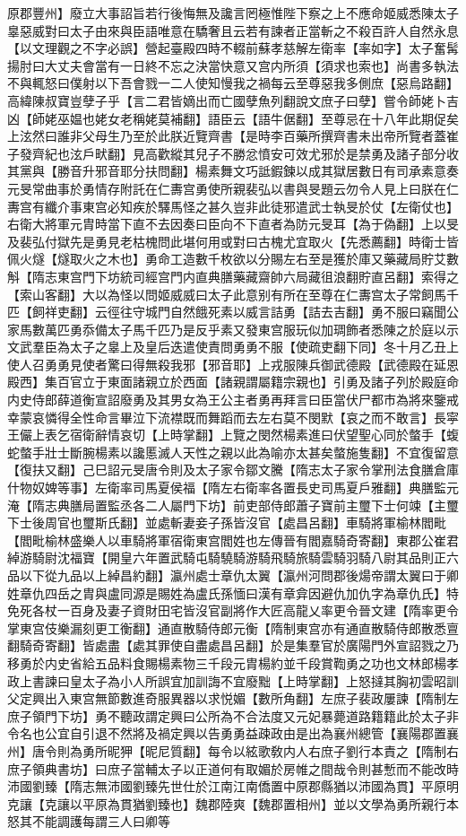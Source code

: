 原郡豐州】廢立大事詔旨若行後悔無及讒言罔極惟陛下察之上不應命姬威悉陳太子辠惡威對曰太子由來與臣語唯意在驕奢且云若有諫者正當斬之不殺百許人自然永息【以文理觀之不字必誤】營起臺殿四時不輟前蘇孝慈解左衛率【率如字】太子奮髯揚肘曰大丈夫會當有一日終不忘之決當快意又宫内所須【須求也索也】尚書多執法不與輒怒曰僕射以下吾會戮一二人使知慢我之禍每云至尊惡我多側庶【惡烏路翻】高緯陳叔寶豈孽子乎【言二君皆嫡出而亡國孽魚列翻說文庶子曰孽】嘗令師姥卜吉凶【師姥巫媪也姥女老稱姥莫補翻】語臣云【語牛倨翻】至尊忌在十八年此期促矣上泫然曰誰非父母生乃至於此朕近覽齊書【是時李百藥所撰齊書未出帝所覽者蓋崔子發齊紀也泫戶畎翻】見高歡縱其兒子不勝忿憤安可效尤邪於是禁勇及諸子部分收其黨與【勝音升邪音耶分扶問翻】楊素舞文巧詆鍜鍊以成其獄居數日有司承素意奏元旻常曲事於勇情存附託在仁夀宫勇使所親裴弘以書與旻題云勿令人見上曰朕在仁夀宫有纖介事東宫必知疾於驛馬怪之甚久豈非此徒邪遣武士執旻於仗【左衛仗也】右衛大將軍元胄時當下直不去因奏曰臣向不下直者為防元旻耳【為于偽翻】上以旻及裴弘付獄先是勇見老枯槐問此堪何用或對曰古槐尤宜取火【先悉薦翻】時衛士皆佩火燧【燧取火之木也】勇命工造數千枚欲以分賜左右至是獲於庫又藥藏局貯艾數斛【隋志東宫門下坊統司經宫門内直典膳藥藏齋帥六局藏徂浪翻貯直呂翻】索得之【索山客翻】大以為怪以問姬威威曰太子此意别有所在至尊在仁夀宫太子常飼馬千匹【飼祥吏翻】云徑往守城門自然餓死素以威言詰勇【詰去吉翻】勇不服曰竊聞公家馬數萬匹勇忝備太子馬千匹乃是反乎素又發東宫服玩似加琱飾者悉陳之於庭以示文武羣臣為太子之辠上及皇后迭遣使責問勇勇不服【使疏吏翻下同】冬十月乙丑上使人召勇勇見使者驚曰得無殺我邪【邪音耶】上戎服陳兵御武德殿【武德殿在延恩殿西】集百官立于東面諸親立於西面【諸親謂屬籍宗親也】引勇及諸子列於殿庭命内史侍郎薛道衡宣詔廢勇及其男女為王公主者勇再拜言曰臣當伏尸都市為將來鑒戒幸蒙哀憐得全性命言畢泣下流襟既而舞蹈而去左右莫不閔默【哀之而不敢言】長寜王儼上表乞宿衛辭情哀切【上時掌翻】上覽之閔然楊素進曰伏望聖心同於螫手【蝮蛇螫手壯士斷腕楊素以讒慝滅人天性之親以此為喻亦太甚矣螫施隻翻】不宜復留意【復扶又翻】己巳詔元旻唐令則及太子家令鄒文騰【隋志太子家令掌刑法食膳倉庫什物奴婢等事】左衛率司馬夏侯福【隋左右衛率各置長史司馬夏戶雅翻】典膳監元淹【隋志典膳局置監丞各二人屬門下坊】前吏部侍郎蕭子寶前主璽下士何竦【主璽下士後周官也璽斯氏翻】並處斬妻妾子孫皆沒官【處昌呂翻】車騎將軍榆林閻毗【閻毗榆林盛樂人以車騎將軍宿衛東宫閻姓也左傳晉有閻嘉騎奇寄翻】東郡公崔君綽游騎尉沈福寶【開皇六年置武騎屯騎驍騎游騎飛騎旅騎雲騎羽騎八尉其品則正六品以下從九品以上綽昌約翻】瀛州處士章仇太翼【瀛州河問郡後煬帝謂太翼曰于卿姓章仇四岳之胄與盧同源是賜姓為盧氏孫愐曰漢有章弇因避仇加仇字為章仇氏】特免死各杖一百身及妻子資財田宅皆沒官副將作大匠高龍乂率更令晉文建【隋率更令掌東宫伎樂漏刻更工衡翻】通直散騎侍郎元衡【隋制東宫亦有通直散騎侍郎散悉亶翻騎奇寄翻】皆處盡【處其罪使自盡處昌呂翻】於是集羣官於廣陽門外宣詔戮之乃移勇於内史省給五品料食賜楊素物三千段元胄楊約並千段賞鞫勇之功也文林郎楊孝政上書諫曰皇太子為小人所誤宜加訓誨不宜廢黜【上時掌翻】上怒撻其胸初雲昭訓父定興出入東宫無節數進奇服異器以求悦媚【數所角翻】左庶子裴政屢諫【隋制左庶子領門下坊】勇不聽政謂定興曰公所為不合法度又元妃暴薨道路籍籍此於太子非令名也公宜自引退不然將及禍定興以告勇勇益疎政由是出為襄州總管【襄陽郡置襄州】唐令則為勇所昵狎【昵尼質翻】每令以絃歌敎内人右庶子劉行本責之【隋制右庶子領典書坊】曰庶子當輔太子以正道何有取媚於房帷之間哉令則甚慙而不能改時沛國劉臻【隋志無沛國劉臻先世仕於江南江南僑置中原郡縣猶以沛國為貫】平原明克讓【克讓以平原為貫猶劉臻也】魏郡陸爽【魏郡置相州】並以文學為勇所親行本怒其不能調護每謂三人曰卿等